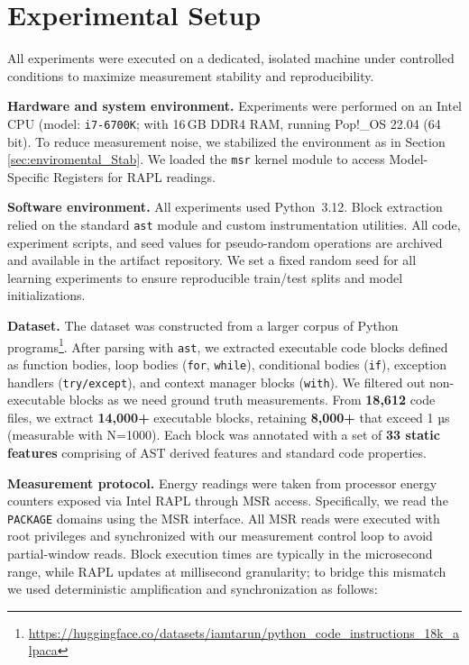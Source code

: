 \section{Experimental Setup}
\label{sec:exp-setup}
All experiments were executed on a dedicated, isolated machine under controlled conditions to maximize measurement stability and reproducibility.

\textbf{Hardware and system environment.}
Experiments were performed on an Intel CPU (model: \texttt{i7-6700K}; with 16\,GB DDR4 RAM, running Pop!\_OS 22.04 (64 bit). To reduce measurement noise, we stabilized the environment as in Section \ref{sec:enviromental_Stab}. We loaded the \texttt{msr} kernel module to access Model-Specific Registers for RAPL readings.


\textbf{Software environment.}
All experiments used Python~3.12. Block extraction relied on the standard \texttt{ast} module and custom instrumentation utilities. All code, experiment scripts, and seed values for pseudo-random operations are archived and available in the artifact repository. We set a fixed random seed for all learning experiments to ensure reproducible train/test splits and model initializations.

\textbf{Dataset.}
The dataset was constructed from a larger corpus of Python programs\footnote{\url{https://huggingface.co/datasets/iamtarun/python_code_instructions_18k_alpaca}}. After parsing with \texttt{ast}, we extracted executable code blocks defined as function bodies, loop bodies (\texttt{for}, \texttt{while}), conditional bodies (\texttt{if}), exception handlers (\texttt{try/except}), and context manager blocks (\texttt{with}). We filtered out non-executable blocks as we need ground truth measurements. From \textbf{18,612} code files, we extract \textbf{14,000+} executable blocks, retaining \textbf{8,000+} that exceed 1 µs (measurable with N=1000). Each block was annotated with a set of \textbf{33 static features} comprising of AST derived features and standard code properties.

\textbf{Measurement protocol.}
Energy readings were taken from processor energy counters exposed via Intel RAPL through MSR access. Specifically, we read the \texttt{PACKAGE} domains using the MSR interface. All MSR reads were executed with root privileges and synchronized with our measurement control loop to avoid partial-window reads. 
Block execution times are typically in the microsecond range, while RAPL updates at millisecond granularity; to bridge this mismatch we used deterministic amplification and synchronization as follows:

